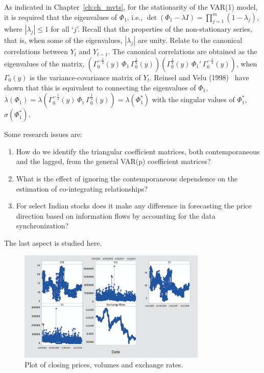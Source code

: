As indicated in Chapter~\ref{ch:ch_mvts}, for the stationarity of the VAR(1) model, it is required that the eigenvalues of $\Phi_1$, i.e., $\det(\Phi_1 - \lambda I)= \prod_{j=1}^m (1-\lambda_j)$, where $|\lambda_j| \leq 1$ for all `$j$'. Recall that the properties of the non-stationary series, that is, when some of the eigenvalues, $|\lambda_j|$ are unity. Relate to the canonical correlations between $Y_t$ and $Y_{t-1}$. The canonical correlations are obtained as the eigenvalues of the matrix, $(\Gamma_0^{- \frac{1}{2}} (y)\, \Phi_1 \,\Gamma_0^{\frac{1}{2}}(y)) ( \Gamma_0^{\frac{1}{2}}(y) \,\Phi_1'\,  \Gamma_0^{-\frac{1}{2}}(y))$, when $\Gamma_0(y)$ is the variance-covariance matrix of $Y_t$. Reinsel and Velu (1998)~\cite{velurein} have shown that this is equivalent  to connecting the eigenvalues of $\Phi_1$, $\lambda(\Phi_1)= \lambda( \Gamma_0^{-\frac{1}{2}} (y) \,\Phi_1\, \Gamma_0^{\frac{1}{2}}(y))= \lambda(\Phi_1^*)$ with the singular values of $\Phi_1^*$, $\sigma(\Phi_1^*)$. 


Some research issues are: 


\begin{enumerate}[--]
\item How do we identify the triangular coefficient matrices, both contemporaneous and the lagged, from the general VAR(p) coefficient matrices?
\item What is the effect of ignoring the contemporaneous dependence on the estimation of co-integrating relationships?
\item For select Indian stocks does it make any difference in forecasting the price direction based on information flows by accounting for the data synchronization?
\end{enumerate}
The last aspect is studied here. 


        \begin{figure}[!ht]
        \centering
        \includegraphics[width=0.8\textwidth]{chapters/chapter_stat_ts/figures/cpver.png}
        \caption{Plot of closing prices, volumes and exchange rates. \label{fig:cpver}}
        \end{figure}


